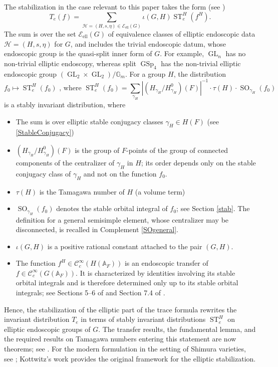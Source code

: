\documentclass[11pt,a4paper]{article}
\newcommand{\Eell}{\mathcal{E}_{\mathrm{ell}}}
\theoremstyle{definition}
\theoremstyle{plain}
\theoremstyle{remark}
\theoremstyle{plain}
\DeclareMathOperator{\ST}{ST}
\DeclareMathOperator{\GL}{GL}
\DeclareMathOperator{\GSp}{GSp}
\DeclareMathOperator{\SO}{SO}
\begin{document}
The stabilization in the case relevant to this paper takes the form (see \cite[\S 9.1]{kisin2021stabletraceformulashimura})
$$ T_e(f) = \sum_{\mathcal{H}=(H,s,\eta) \in \Eell(G)} \iota(G,H) \ST_e^H(f^H).$$
The sum is over the set $\Eell(G)$ of equivalence classes of elliptic endoscopic data $\mathcal{H}=(H,s,\eta)$ for $G$, and includes the trivial endoscopic datum, whose endoscopic group is the quasi-split inner form of $G$. For example, $\GL_n$ has no non-trivial elliptic endoscopy, whereas split $\GSp_4$ has the non-trivial elliptic endoscopic group $(\GL_2 \times \GL_2)/\mathbb{G}_m$. For a group $H$, the distribution $$ f_0 \mapsto \ST_e^H(f_0) \text{ , where } \ST_e^H(f_0) = \sum_{\gamma_H} | (H_{\gamma_H}/H_{\gamma_H}^0)(F) |^{-1} \cdot \tau(H) \cdot \SO_{\gamma_H}(f_0)$$ is a stably invariant distribution, where
\begin{itemize}
    \item The sum is over elliptic stable conjugacy classes $\gamma_H \in H(F)$ (see \ref{StableConjugacy})
    \item $(H_{\gamma_H}/H_{\gamma_H}^0)(F)$ is the group of $F$-points of the group of connected components of the centralizer of $\gamma_H$ in $H$; its order depends only on the stable conjugacy class of $\gamma_H$ and not on the function $f_0$.
    \item $\tau(H)$ is the Tamagawa number of $H$ (a volume term)
    \item $\SO_{\gamma_H}(f_0)$ denotes the stable orbital integral of $f_0$; see Section \ref{stab}. The definition for a general semisimple element, whose centralizer may be disconnected, is recalled in Complement \ref{SOgeneral}.
    \item $\iota(G,H)$ is a positive rational constant attached to the pair $(G,H)$.
    \item The function $f^H \in \mathcal{C}^{\infty}_c(H(\mathbb{A}_F))$ is an endoscopic transfer of $f \in \mathcal{C}^{\infty}_c(G(\mathbb{A}_F))$. It is characterized by identities involving its stable orbital integrals and is therefore determined only up to its stable orbital integrals; see Sections 5--6 of \cite{MR858284} and Section 7.4 of \cite{kisin2021stabletraceformulashimura}.
\end{itemize}

Hence, the stabilization of the elliptic part of the trace formula rewrites the invariant distribution $T_e$ in terms of stably invariant distributions $\ST_e^H$ on elliptic endoscopic groups of $G$. The transfer results, the fundamental lemma, and the required results on Tamagawa numbers entering this statement are now theorems; see \cite{MR942522,MR2653248,MR3051198}. For the modern formulation in the setting of Shimura varieties, see \cite[\S 9.1]{kisin2021stabletraceformulashimura}; Kottwitz's work \cite{MR858284} provides the original framework for the elliptic stabilization.
\end{document}
